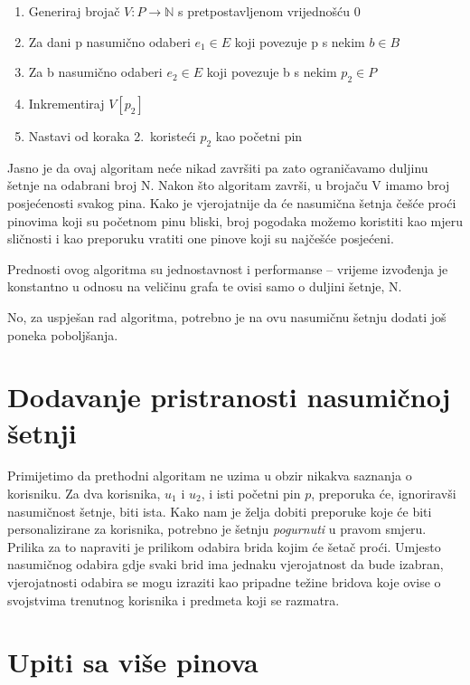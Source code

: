 \documentclass[times, utf8, seminar]{fer}
\begin{document}
\begin{enumerate}
	\item Generiraj brojač $V: P \to \mathbb{N}$ s pretpostavljenom vrijednošću 0
	\item Za dani p nasumično odaberi $e_1 \in E$ koji povezuje p s nekim $b \in B$
	\item Za b nasumično odaberi $e_2 \in E$ koji povezuje b s nekim $p_2 \in P$
	\item Inkrementiraj $V[p_2]$
	\item Nastavi od koraka 2.\ koristeći $p_2$ kao početni pin
\end{enumerate}

Jasno je da ovaj algoritam neće nikad završiti pa zato ograničavamo duljinu šetnje na odabrani broj N. Nakon što algoritam završi, u brojaču V imamo broj posjećenosti svakog pina. Kako je vjerojatnije da će nasumična šetnja češće proći pinovima koji su početnom pinu bliski, broj pogodaka možemo koristiti kao mjeru sličnosti i kao preporuku vratiti one pinove koji su najčešće posjećeni.

Prednosti ovog algoritma su jednostavnost i performanse -- vrijeme izvođenja je konstantno u odnosu na veličinu grafa te ovisi samo o duljini šetnje, N.

No, za uspješan rad algoritma, potrebno je na ovu nasumičnu šetnju dodati još poneka poboljšanja.

\section{Dodavanje pristranosti nasumičnoj šetnji}

Primijetimo da prethodni algoritam ne uzima u obzir nikakva saznanja o korisniku. Za dva korisnika, $u_1$ i $u_2$, i isti početni pin $p$, preporuka će, ignoriravši nasumičnost šetnje, biti ista. Kako nam je želja dobiti preporuke koje će biti personalizirane za korisnika, potrebno je šetnju \textit{pogurnuti} u pravom smjeru. Prilika za to napraviti je prilikom odabira brida kojim će šetač proći. Umjesto nasumičnog odabira gdje svaki brid ima jednaku vjerojatnost da bude izabran, vjerojatnosti odabira se mogu izraziti kao pripadne težine bridova koje ovise o svojstvima trenutnog korisnika i predmeta koji se razmatra.

\section{Upiti sa više pinova}
\label{multipin}
\end{document}
